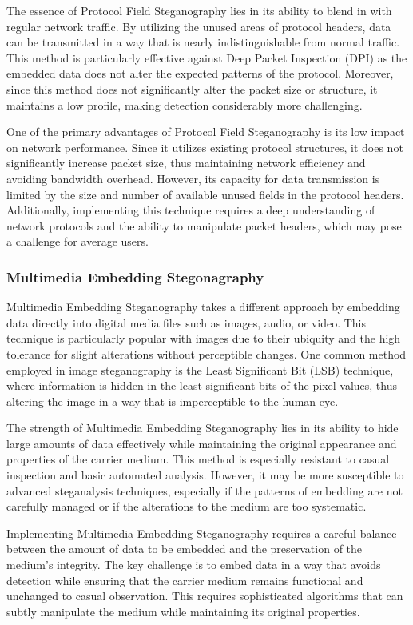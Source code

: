 \documentclass[12pt, fleqn, a4paper]{article}
\begin{document}
The essence of Protocol Field Steganography lies in its ability to blend in with regular network traffic. By utilizing the unused areas of protocol headers, data can be transmitted in a way that is nearly indistinguishable from normal traffic. This method is particularly effective against Deep Packet Inspection (DPI) as the embedded data does not alter the expected patterns of the protocol. Moreover, since this method does not significantly alter the packet size or structure, it maintains a low profile, making detection considerably more challenging.

One of the primary advantages of Protocol Field Steganography is its low impact on network performance. Since it utilizes existing protocol structures, it does not significantly increase packet size, thus maintaining network efficiency and avoiding bandwidth overhead. However, its capacity for data transmission is limited by the size and number of available unused fields in the protocol headers. Additionally, implementing this technique requires a deep understanding of network protocols and the ability to manipulate packet headers, which may pose a challenge for average users.
\subsubsection{Multimedia Embedding Stegonagraphy}
Multimedia Embedding Steganography takes a different approach by embedding data directly into digital media files such as images, audio, or video. This technique is particularly popular with images due to their ubiquity and the high tolerance for slight alterations without perceptible changes. One common method employed in image steganography is the Least Significant Bit (LSB) technique, where information is hidden in the least significant bits of the pixel values, thus altering the image in a way that is imperceptible to the human eye.

The strength of Multimedia Embedding Steganography lies in its ability to hide large amounts of data effectively while maintaining the original appearance and properties of the carrier medium. This method is especially resistant to casual inspection and basic automated analysis. However, it may be more susceptible to advanced steganalysis techniques, especially if the patterns of embedding are not carefully managed or if the alterations to the medium are too systematic.

Implementing Multimedia Embedding Steganography requires a careful balance between the amount of data to be embedded and the preservation of the medium’s integrity. The key challenge is to embed data in a way that avoids detection while ensuring that the carrier medium remains functional and unchanged to casual observation. This requires sophisticated algorithms that can subtly manipulate the medium while maintaining its original properties.
\end{document}
